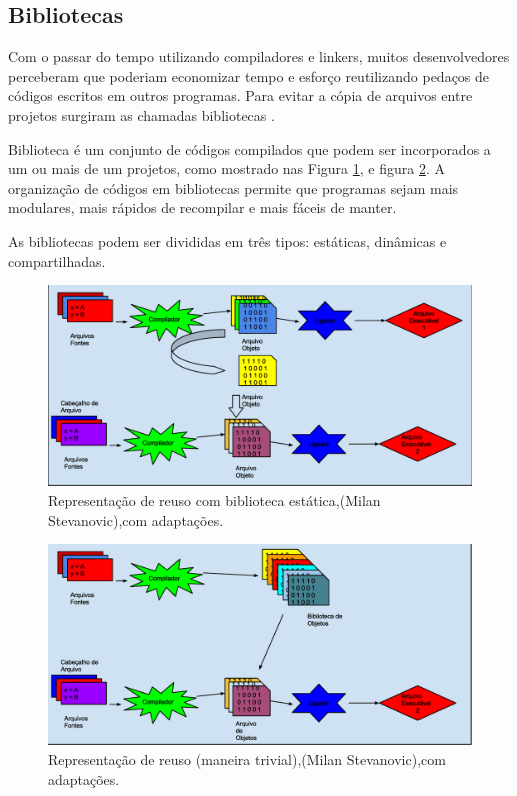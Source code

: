 \subsection{Bibliotecas}

Com o passar do tempo utilizando compiladores e linkers, muitos 
desenvolvedores perceberam que poderiam economizar tempo e esforço 
reutilizando pedaços de códigos escritos em outros programas. Para evitar a
 cópia de arquivos entre projetos surgiram as chamadas bibliotecas \cite{ref38}.

Biblioteca é um conjunto de códigos compilados que podem ser incorporados a
 um ou mais de um projetos, como mostrado nas Figura \ref{fig04}, e figura
 \ref{fig05}. A organização de códigos em bibliotecas permite que 
programas sejam mais modulares, mais rápidos de recompilar e mais 
fáceis de manter\cite{Lasca}.

As bibliotecas podem ser divididas em três tipos: estáticas, 
dinâmicas e compartilhadas\cite{Lasca}.

\begin{figure}[h]
    \centering
        \includegraphics[keepaspectratio=true,scale=0.45]{figuras/reuso_lib_estatica.eps}
    \caption{ Representação de reuso com biblioteca estática,(Milan Stevanovic),com adaptações.}
    \label{fig04}
\end{figure}

\begin{figure}[h]
    \centering
        \includegraphics[keepaspectratio=true,scale=0.45]{figuras/reuso_lib_estatica2.eps}
    \caption{Representação de reuso (maneira trivial),(Milan Stevanovic),com adaptações.}
    \label{fig05}
\end{figure}


